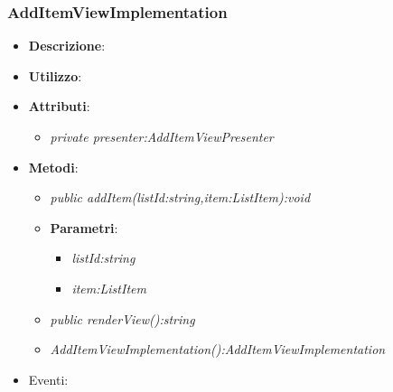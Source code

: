 \subsubsection{AddItemViewImplementation}
\begin{itemize}
\item \textbf{Descrizione}: 
\item \textbf{Utilizzo}:
\item \textbf{Attributi}: 
	\begin{itemize}
	\item \textit{private presenter:AddItemViewPresenter}\\
	
	\end{itemize}
\item \textbf{Metodi}:
	\begin{itemize}
	\item \textit{public addItem(listId:string,item:ListItem):void}\\

			\item{\textbf{Parametri}: \begin{itemize}
			\item \textit{listId:string}\\

			\item \textit{item:ListItem}\\

			\end{itemize}}
	\item \textit{public renderView():string}\\
	
	\item \textit{AddItemViewImplementation():AddItemViewImplementation}\\
	
	\end{itemize}
\item{Eventi}:
\end{itemize}

